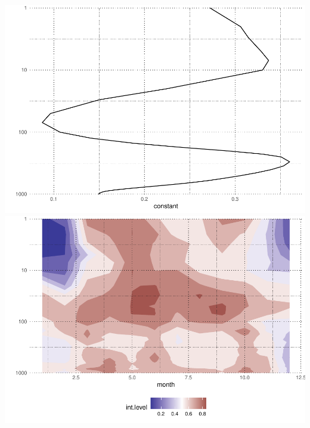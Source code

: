 \documentclass[]{ametsocV5}
\begin{document}
\includegraphics{unnamed-chunk-1-1} \includegraphics{unnamed-chunk-1-2}
\end{document}
